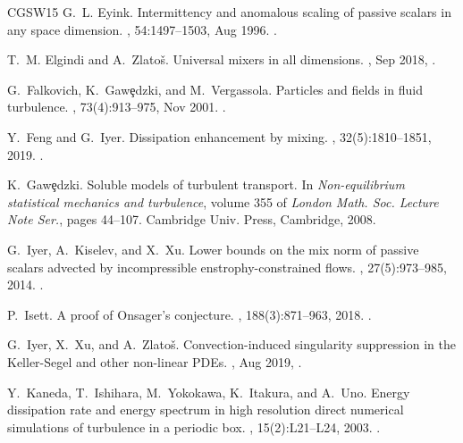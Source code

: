 \documentclass[12pt]{report}   %
\numberwithin{equation}{section}
\theoremstyle{plain}
\theoremstyle{definition}
\theoremstyle{remark}
\begin{document}
\begin{thebibliography}{CGSW15}
G.~L. Eyink.
\newblock Intermittency and anomalous scaling of passive scalars in any space
  dimension.
, 54:1497--1503, Aug 1996.
\newblock {}.

T.~M. {Elgindi} and A.~{Zlato{\v{s}}}.
\newblock Universal mixers in all dimensions.
, Sep 2018,
  .

G.~Falkovich, K.~Gaw\c{e}dzki, and M.~Vergassola.
\newblock Particles and fields in fluid turbulence.
, 73(4):913–975, Nov 2001.
\newblock {}.

Y.~Feng and G.~Iyer.
\newblock Dissipation enhancement by mixing.
, 32(5):1810--1851, 2019.
\newblock {}.

K.~Gaw\c{e}dzki.
\newblock Soluble models of turbulent transport.
\newblock In {\em Non-equilibrium statistical mechanics and turbulence}, volume
  355 of {\em London Math. Soc. Lecture Note Ser.}, pages 44--107. Cambridge
  Univ. Press, Cambridge, 2008.

G.~Iyer, A.~Kiselev, and X.~Xu.
\newblock Lower bounds on the mix norm of passive scalars advected by
  incompressible enstrophy-constrained flows.
, 27(5):973--985, 2014.
\newblock {}.

P.~Isett.
\newblock A proof of {O}nsager's conjecture.
, 188(3):871--963, 2018.
\newblock {}.

G.~Iyer, X.~Xu, and A.~Zlato\v{s}.
\newblock Convection-induced singularity suppression in the {K}eller-{S}egel
  and other non-linear {PDEs}.
, Aug 2019,
  .

Y.~Kaneda, T.~Ishihara, M.~Yokokawa, K.~Itakura, and A.~Uno.
\newblock Energy dissipation rate and energy spectrum in high resolution direct
  numerical simulations of turbulence in a periodic box.
, 15(2):L21--L24, 2003.
\newblock {}.


\end{thebibliography}
\end{document}
